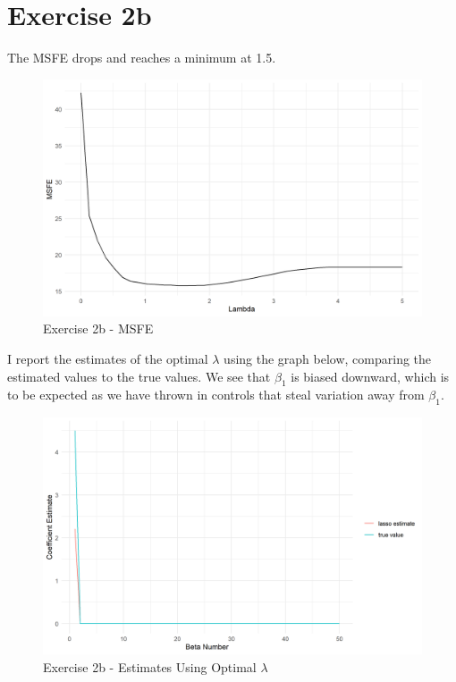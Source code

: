 \documentclass[reqno,12pt,notitlepage]{article}
\begin{document}
\newpage
\section*{Exercise 2b}
The MSFE drops and reaches a minimum at 1.5.  
\begin{figure}[!h]
    \centering
    \includegraphics[width=.8\textwidth]{lambda_2b.png}
    \caption{Exercise 2b - MSFE}
\end{figure}

I report the estimates of the optimal $\lambda$ using the graph below, comparing the estimated values to the true values. We see that $\beta_1$ is biased downward, which is to be expected as we have thrown in controls that steal variation away from $\beta_1$.
\begin{figure}[!h]
    \centering
    \includegraphics[width=.8\textwidth]{estimate_2b.png}
    \caption{Exercise 2b - Estimates Using Optimal $\lambda$}
\end{figure}
\end{document}

